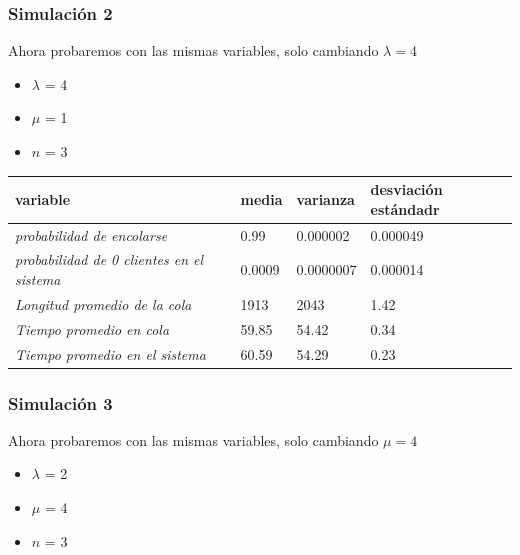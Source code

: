 \documentclass[11pt]{article}
\begin{document}
    \subsubsection{Simulación 2}

    Ahora probaremos con las mismas variables, solo cambiando $\lambda = 4$ 
    \begin{itemize}
        \item $\lambda$ = 4
        \item $\mu$ = 1
        \item $n$ = 3
    \end{itemize} 

    \begin{table}[h]
\begin{tabular}{|l|l|l|l|}
\hline
\textbf{variable}                                 & \textbf{media} & \textbf{varianza} & \textbf{desviación estándadr} \\ \hline
\textit{probabilidad de encolarse}                & 0.99          & 0.000002             & 0.000049                    \\ \hline
\textit{probabilidad de 0 clientes en el sistema} & 0.0009         & 0.0000007            & 0.000014                        \\ \hline
\textit{Longitud promedio de la cola}             & 1913            & 2043              & 1.42                           \\ \hline
\textit{Tiempo promedio en cola}                  & 59.85           & 54.42            & 0.34                       \\ \hline
\textit{Tiempo promedio en el sistema}            & 60.59           & 54.29             & 0.23                      \\ \hline
\end{tabular}
\end{table}

    \newpage
\subsubsection{Simulación 3}
    Ahora probaremos con las mismas variables, solo cambiando $\mu = 4$ \\
    \begin{itemize}
        \item $\lambda$ = 2
        \item $\mu$ = 4
        \item $n$ = 3
    \end{itemize}
\end{document}
